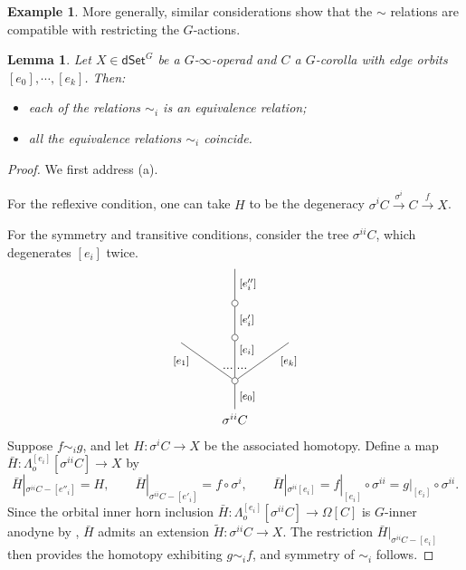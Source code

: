 \documentclass[a4paper,10pt
,draft
]{article}%
\numberwithin{equation}{section}
\numberwithin{figure}{section}
\newtheorem{lemma}[equation]{Lemma}%
\theoremstyle{definition} %
\newtheorem{example}[equation]{Example}%
\newcommand{\1}{\ensuremath{\mathbbm 1}}%
\begin{document}
\begin{example}
More generally, similar considerations show that the $\sim$ relations are compatible with restricting the $G$-actions.
\end{example}


\begin{lemma}\label{EQUIVI LEM}
	Let $X \in \mathsf{dSet}^G$ be a $G$-$\infty$-operad and $C$ a $G$-corolla with edge orbits
	$[e_0],\cdots,[e_k]$. Then:
\begin{itemize}
	\item[(a)] each of the relations $\sim_i$ is an equivalence relation;
	\item[(b)] all the equivalence relations $\sim_i$ coincide.
\end{itemize}
\end{lemma}

\begin{proof}
	We first address (a). 
	
	For the reflexive condition, one can take $H$ to be the degeneracy
	$\sigma^i C \xrightarrow{\sigma^i} C \xrightarrow{f} X$.
	
	For the symmetry and transitive conditions, consider the tree
	$\sigma^{ii} C$, which degenerates $[e_i]$ twice.
\[
\begin{tikzpicture}
[grow=up,auto,level distance=3em,
every node/.style = {font=\footnotesize},
dummy/.style={circle,draw,inner sep=0pt,minimum size=1.75mm}]
	\node at (0,0) [font=\normalsize]{$\sigma^{ii} C$}
		child{node [dummy] {}
			child{
			edge from parent node [swap,near end] {$[e_k]$} node [near start,inner sep=1pt,name=Kn] {}}
			child[level distance=3.4em]{node [dummy] {}
				child[level distance=2.7em]{node [dummy] {}
					child[level distance=2.7em]{
					edge from parent node [swap] {$[e''_i]$}
}
				edge from parent node [swap] {$[e'_i]$}
}
			edge from parent node [near end,swap] {$[e_i]$}
node [near start,inner sep=1pt,name=Kone,swap] {}
node [near start,inner sep=1pt,name=Kone1] {}}
			child{
			edge from parent node [near end] {$[e_1]$}
node [swap] {}
node [near start,inner sep=1pt,name=Kn1,swap]{}}
		edge from parent node [swap] {$[e_0]$}
		};
		\draw [dotted,thick] (Kone) -- (Kn) ;
		\draw [dotted,thick] (Kone1) -- (Kn1) ;
\end{tikzpicture}
\]
Suppose $f \sim_i g$, and let 
$H \colon \sigma^{i} C \to X$ be the associated homotopy.
Define a map 
$\bar{H} \colon \Lambda^{[e_i]}_o[\sigma^{ii} C] \to X$ by
\[
	\bar{H}|_{\sigma^{ii}C - [e''_i]} = H,
		\qquad
	\bar{H}|_{\sigma^{ii}C - [e'_i]} = f \circ \sigma^i,
		\qquad
	\bar{H}|_{\sigma^{ii} [e_i]} = 
	f|_{[e_i]} \circ \sigma^{ii} =
	g|_{[e_i]} \circ \sigma^{ii}.
\]
Since the orbital inner horn inclusion
$\bar{H} \colon \Lambda^{[e_i]}_o[\sigma^{ii} C] \to \Omega[C]$
is $G$-inner anodyne by \cite[Prop. 3.13]{BP_edss},
$\bar{H}$ admits an extension $\widetilde{H} \colon \sigma^{ii}C \to X$.
The restriction $\bar{H}|_{\sigma^{ii}C - [e_i]}$ then provides the homotopy exhibiting $g \sim_i f$, and symmetry of $\sim_i$ follows.


\end{proof}
\end{document}
